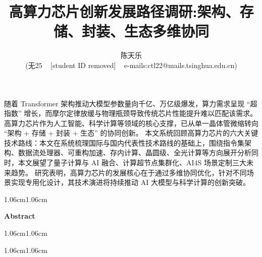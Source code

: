 \documentclass[12pt,a4paper]{article}%
\title{\fontsize{18pt}{27pt}\selectfont%
	{\heiti%
    高算力芯片创新发展路径调研:架构、存储、封装、生态多维协同}}%
\author{陈天乐 \\
        (无25\,\,\,\,\,\,\,[student ID removed]\,\,\,\,\,\,\,e-mails:ctl22@mails.tsinghua.edu.cn)
        }
\date{}%
\begin{document}
	\maketitle%
	\lhead{}%
	\chead{}%
	\rhead{}%
	\lfoot{}%
	\cfoot{\thepage}%
	\rfoot{}%
	\begin{onecolabstract}
		随着 Transformer 架构推动大模型参数量向千亿、万亿级爆发，算力需求呈现 “超指数” 增长，而摩尔定律放缓与物理瓶颈导致传统芯片性能提升难以匹配该需求。高算力芯片作为人工智能、科学计算等领域的核心支撑，已从单一晶体管微缩转向 “架构 + 存储 + 封装 + 生态” 的协同创新。
        本文系统回顾高算力芯片的六大关键技术路线：本文在系统梳理国际与国内代表性技术路线的基础上，围绕指令集架构、数据流处理器、可重构加速、存内计算、晶圆级、全光计算等方向展开分析同时，本文展望了量子计算与 AI 融合、计算超节点集群化、AI4S 场景定制三大未来趋势。
        研究表明，高算力芯片的发展核心在于通过多维协同优化，针对不同场景实现专用化设计，其技术演进将持续推动 AI 大模型与科学计算的创新突破。
        
	\end{onecolabstract}
	
	\begin{adjustwidth}{1.06cm}{1.06cm}
		\fontsize{10.5pt}{15.75pt}
		\bigskip
	\end{adjustwidth}
	
	\begin{center}%
		{\textbf{Abstract}}%
	\end{center}
	\begin{adjustwidth}{1.06cm}{1.06cm}%
		\hspace{1.5em}
        
    \end{adjustwidth}
	\begin{adjustwidth}{1.06cm}{1.06cm}
		\fontsize{10.5pt}{15.75pt}
		\bigskip
	\end{adjustwidth}
	\thispagestyle{empty}

	\newpage
	\begin{center} 
		\tableofcontents
	\end{center}
	\setcounter{page}{0}
	\thispagestyle{empty}
\end{document}
